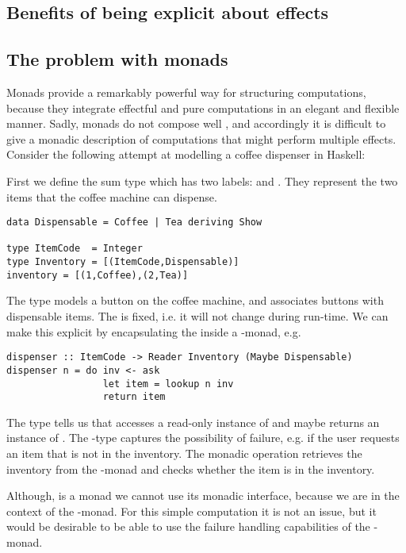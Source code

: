 \subsection{Benefits of being explicit about effects}

\subsection{The problem with monads}\label{sec:problem-with-monads}
Monads provide a remarkably powerful way for structuring computations, because they integrate effectful and pure computations in an elegant and flexible manner.
Sadly, monads do not compose well \cite{Kammar2013}, and accordingly it is difficult to give a monadic description of computations that might perform multiple effects.
Consider the following attempt at modelling a coffee dispenser in Haskell:
\begin{example}\label{ex:coffee1}
First we define the sum type  which has two labels:  and . They represent the two items that the coffee machine can dispense.
\begin{lstlisting}[style={haskell}]
data Dispensable = Coffee | Tea deriving Show

type ItemCode  = Integer
type Inventory = [(ItemCode,Dispensable)]
inventory = [(1,Coffee),(2,Tea)]
\end{lstlisting}
The  type models a button on the coffee machine, and  associates buttons with dispensable items. The  is fixed, i.e. it will not change during run-time. We can make this explicit by encapsulating the  inside a -monad, e.g.
\begin{lstlisting}[style={haskell}]
dispenser :: ItemCode -> Reader Inventory (Maybe Dispensable)
dispenser n = do inv <- ask
                 let item = lookup n inv
                 return item
\end{lstlisting}
The type  tells us that  accesses a read-only instance of  and maybe returns an instance of . The -type captures the possibility of failure, e.g. if the user requests an item that is not in the inventory. 
The monadic operation  retrieves the inventory from the -monad and  checks whether the item  is in the inventory.  

Although,  is a monad we cannot use its monadic interface, because we are in the context of the -monad. For this simple computation it is not an issue, but it would be desirable to be able to use the failure handling capabilities of the -monad.
\end{example}
